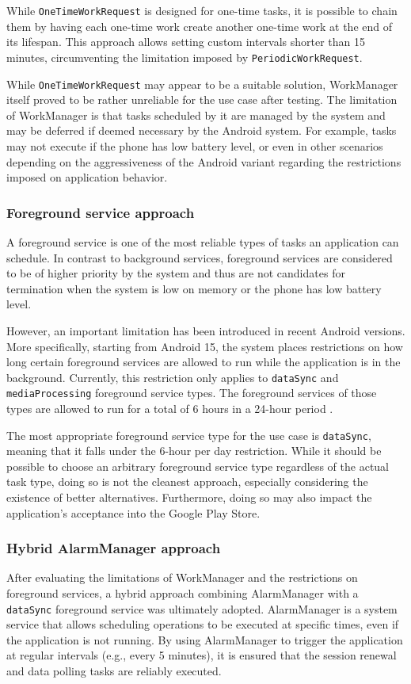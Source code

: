 While \texttt{OneTimeWorkRequest} is designed for one-time tasks, it is possible to chain them by having each one-time work create another one-time work at the end of its lifespan. This approach allows setting custom intervals shorter than 15 minutes, circumventing the limitation imposed by \texttt{PeriodicWorkRequest}.

While \texttt{OneTimeWorkRequest} may appear to be a suitable solution, WorkManager itself proved to be rather unreliable for the use case after testing. The limitation of WorkManager is that tasks scheduled by it are managed by the system and may be deferred if deemed necessary by the Android system. For example, tasks may not execute if the phone has low battery level, or even in other scenarios depending on the aggressiveness of the Android variant regarding the restrictions imposed on application behavior.

\subsubsection{Foreground service approach}
A foreground service is one of the most reliable types of tasks an application can schedule. In contrast to background services, foreground services are considered to be of higher priority by the system and thus are not candidates for termination when the system is low on memory or the phone has low battery level.

However, an important limitation has been introduced in recent Android versions. More specifically, starting from Android 15, the system places restrictions on how long certain foreground services are allowed to run while the application is in the background. Currently, this restriction only applies to \texttt{dataSync} and \texttt{mediaProcessing} foreground service types. The foreground services of those types are allowed to run for a total of 6 hours in a 24-hour period \cite{android-15-datasync-timeout}.

The most appropriate foreground service type for the use case is \texttt{dataSync}, meaning that it falls under the 6-hour per day restriction. While it should be possible to choose an arbitrary foreground service type regardless of the actual task type, doing so is not the cleanest approach, especially considering the existence of better alternatives. Furthermore, doing so may also impact the application's acceptance into the Google Play Store.

\subsubsection{Hybrid AlarmManager approach}
\label{alarmmanager-approach}
After evaluating the limitations of WorkManager and the restrictions on foreground services, a hybrid approach combining AlarmManager with a \texttt{dataSync} foreground service was ultimately adopted. AlarmManager is a system service that allows scheduling operations to be executed at specific times, even if the application is not running. By using AlarmManager to trigger the application at regular intervals (e.g., every 5 minutes), it is ensured that the session renewal and data polling tasks are reliably executed.

